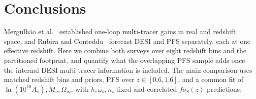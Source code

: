 \documentclass[a4paper,11pt]{article}
\newcommand{\revchange}[1]{{\color{RevisionColor}#1}}
\newcommand{\Om}{\Omega_m}
\newcommand{\se}{\ensuremath{\sigma_{8}}\xspace}
\newcommand{\Mnu}{M_\nu}
\begin{document}
\section{Conclusions}
\label{sec:conclusions}

\revchange{Mergulh\~{a}o et al.~\cite{Mergulhao:2021kip,Mergulhao:2023zso}
established one-loop multi-tracer gains in real and redshift space, and
Rubira and Conteddu~\cite{Rubira:2025scu} forecast DESI and PFS separately,
each at one effective redshift. Here we combine both surveys over eight
redshift bins and the partitioned footprint, and quantify what the
overlapping PFS sample adds once the internal DESI multi-tracer information
is included. The main comparison uses matched redshift bins
and priors, PFS over $z\in[0.6,1.6]$, and a common fit of
$\ln(10^{10}A_s),\Mnu,\Om$, with $h,\omega_b,n_s$ fixed and
correlated $f\se(z)$ predictions:}
\end{document}

